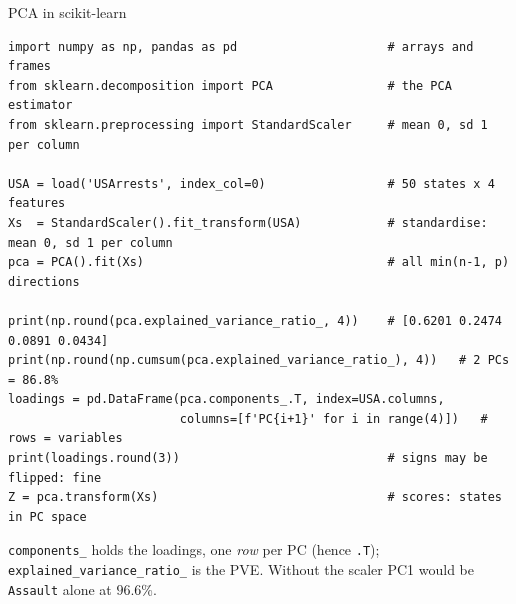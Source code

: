 \documentclass[aspectratio=169,11pt]{beamer}
\begin{document}
\begin{frame}[fragile]{PCA in scikit-learn}
  \begin{lstlisting}
import numpy as np, pandas as pd                     # arrays and frames
from sklearn.decomposition import PCA                # the PCA estimator
from sklearn.preprocessing import StandardScaler     # mean 0, sd 1 per column

USA = load('USArrests', index_col=0)                 # 50 states x 4 features
Xs  = StandardScaler().fit_transform(USA)            # standardise: mean 0, sd 1 per column
pca = PCA().fit(Xs)                                  # all min(n-1, p) directions

print(np.round(pca.explained_variance_ratio_, 4))    # [0.6201 0.2474 0.0891 0.0434]
print(np.round(np.cumsum(pca.explained_variance_ratio_), 4))   # 2 PCs = 86.8%
loadings = pd.DataFrame(pca.components_.T, index=USA.columns,
                        columns=[f'PC{i+1}' for i in range(4)])   # rows = variables
print(loadings.round(3))                             # signs may be flipped: fine
Z = pca.transform(Xs)                                # scores: states in PC space
  \end{lstlisting}
  \vspace{-10pt}\footnotesize
  \begin{readme}
    \texttt{components\_} holds the loadings, one \emph{row} per PC (hence \texttt{.T});
    \texttt{explained\_variance\_ratio\_} is the PVE. Without the scaler PC1 would be
    \texttt{Assault} alone at $96.6\%$.
  \end{readme}
\end{frame}
\end{document}
